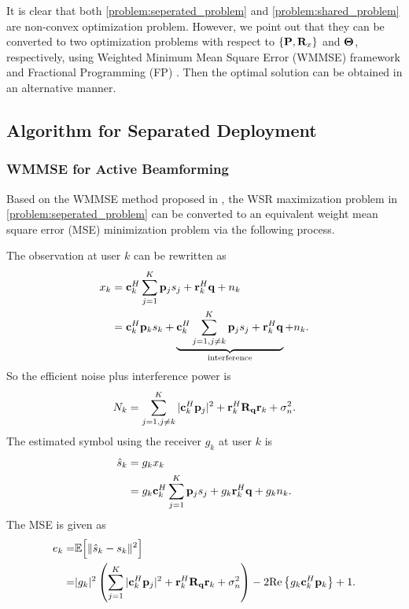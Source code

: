 It is clear that both \eqref{problem:seperated_problem} and \eqref{problem:shared_problem} are non-convex optimization problem.
However, we point out that they can be converted to
two optimization problems with respect to $\{{\bf{P}},{\bf{R}}_x\}$ and
$\bf{\Theta}$, respectively, using Weighted Minimum Mean Square Error (WMMSE) 
framework \cite{christensen2008weighted} and Fractional 
Programming (FP) \cite{shen2018fractional}. Then the optimal solution can be obtained in an alternative manner.

\subsection{Algorithm for Separated Deployment}

\subsubsection{WMMSE for Active Beamforming} \label{sec:WMMSE_separated}

Based on the WMMSE method proposed in \cite{christensen2008weighted}, the WSR 
maximization problem in \eqref{problem:seperated_problem} can be converted to an equivalent weight mean square
error (MSE) minimization problem via the following process.

The observation at user $k$ can be rewritten as
\begin{align} \label{eqn:separated_received_signal_transformed}
    x_k  & = {\bf c}_k^H \sum_{j=1}^K {\bf p}_j s_j +  {\bf r}_k^H {\bf q} + n_k \nonumber
    \\ & = {\bf c}_k^H {\bf p}_k s_k  + \underbrace{{\bf c}_k^H \sum_{j=1, j \neq k}^K {\bf p}_j s_j +  {\bf r}_k^H {\bf q}}_{\text{interference}} + n_k .
\end{align}
So the efficient noise plus interference power is 
\begin{equation} \label{eqn:separated_noise_interference}
    N_k=\sum_{j=1, j\neq k}^K |{\bf c}_k^H {\bf p}_j|^2 + {\bf r}_k^H {\bf R}_{\bf q} {\bf r}_k + \sigma^2_n.
\end{equation}
The estimated symbol using the receiver $g_k$ at user $k$ is
\begin{align} \label{eqn:separated_estimated}
    \hat{s}_k &= g_k x_k \nonumber\\
    &= g_k {\bf c}_k^H \sum_{j=1}^K {\bf p}_j s_j + g_k {\bf r}_k^H {\bf q} + g_k n_k.
\end{align}
The MSE is given as
\begin{align} \label{eqn:separated_mse}
    e_k  = & \mathbb{E} \Big[ \Vert \hat{s}_k - s_k \Vert^2 \Big] \nonumber\\
    = & |g_k|^2 \left( \sum_{j=1}^K | {\bf c}^H_k {\bf p}_j |^2 + {\bf r}_k^H {\bf R}_{\bf q} {\bf r}_k + \sigma_n^2 \right) - 2 \mathrm{Re}\left\{ g_k {\bf c}_k^H {\bf p}_k \right\} + 1.
\end{align}

